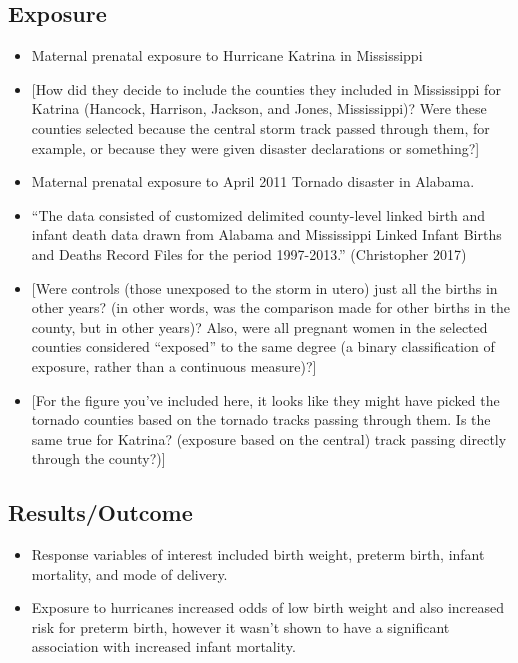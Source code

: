 \documentclass[
]{article}
\providecommand{\tightlist}{%
  \setlength{\itemsep}{0pt}\setlength{\parskip}{0pt}}
\begin{document}
\hypertarget{exposure-15}{%
\subsection{Exposure}\label{exposure-15}}

\begin{itemize}
\tightlist
\item
  Maternal prenatal exposure to Hurricane Katrina in Mississippi
\item
  {[}How did they decide to include the counties they included in
  Mississippi for Katrina (Hancock, Harrison, Jackson, and Jones,
  Mississippi)? Were these counties selected because the central storm
  track passed through them, for example, or because they were given
  disaster declarations or something?{]}
\item
  Maternal prenatal exposure to April 2011 Tornado disaster in Alabama.
\item
  ``The data consisted of customized delimited county-level linked birth
  and infant death data drawn from Alabama and Mississippi Linked Infant
  Births and Deaths Record Files for the period 1997-2013.''
  (Christopher 2017)
\item
  {[}Were controls (those unexposed to the storm in utero) just all the
  births in other years? (in other words, was the comparison made for
  other births in the county, but in other years)? Also, were all
  pregnant women in the selected counties considered ``exposed'' to the
  same degree (a binary classification of exposure, rather than a
  continuous measure)?{]}
\item
  {[}For the figure you've included here, it looks like they might have
  picked the tornado counties based on the tornado tracks passing
  through them. Is the same true for Katrina? (exposure based on the
  central) track passing directly through the county?){]}
\end{itemize}

\hypertarget{resultsoutcome-2}{%
\subsection{Results/Outcome}\label{resultsoutcome-2}}

\begin{itemize}
\tightlist
\item
  Response variables of interest included birth weight, preterm birth,
  infant mortality, and mode of delivery.
\item
  Exposure to hurricanes increased odds of low birth weight and also
  increased risk for preterm birth, however it wasn't shown to have a
  significant association with increased infant mortality.
\end{itemize}
\end{document}
